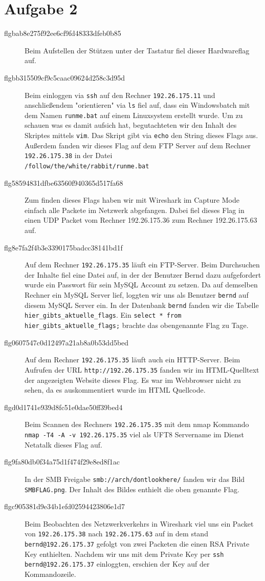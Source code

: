 \documentclass[10pt,a4paper]{article}
\begin{document}
\section{Aufgabe 2}
\begin{description}
	\item[flgbab8e275f92ee6cf9fd48333dfeb0b85] Beim Aufstellen der Stützen unter der Tastatur fiel dieser Hardwareflag auf. 
	\item[flgbb315509cf9c5caac09624d258c3d95d] Beim einloggen via \texttt{ssh} auf den Rechner \texttt{192.26.175.11} und anschließendem "orientieren" via \texttt{ls} fiel auf, dass ein Windowsbatch mit dem Namen \texttt{runme.bat} auf einem Linuxsystem erstellt wurde. Um zu schauen was es damit aufsich hat, begutachteten wir den Inhalt des Skriptes mittels \texttt{vim}. Das Skript gibt via \texttt{echo} den String dieses Flags aus.
	Außerdem fanden wir dieses Flag auf dem FTP Server auf dem Rechner \texttt{192.26.175.38} in der Datei \\ \texttt{/follow/the/white/rabbit/runme.bat}
	\item[flg58594831dfbe63560f940365d517fa68] Zum finden dieses Flags haben wir mit Wireshark im Capture Mode einfach alle Packete im Netzwerk abgefangen. Dabei fiel dieses Flag in einen UDP Packet vom Rechner 192.26.175.36 zum Rechner 192.26.175.63 auf.
	\item[flg8e7fa2f4b3e3390175badcc38141bd1f] Auf dem Rechner \texttt{192.26.175.35} läuft ein FTP-Server. Beim Durchsuchen der Inhalte fiel eine Datei auf, in der der Benutzer Bernd dazu aufgefordert wurde ein Passwort für sein MySQL Account zu setzen. Da auf demselben Rechner ein MySQL Server lief, loggten wir uns als Benutzer \texttt{bernd} auf diesem MySQL Server ein. In der Datenbank \texttt{bernd} fanden wir die Tabelle \texttt{hier\_gibts\_aktuelle\_flags}. Ein \texttt{select * from hier\_gibts\_aktuelle\_flags;} brachte das obengenannte Flag zu Tage.
	\item[flg0607547c0d12497a21ab8a0b53dd5bed] Auf dem Rechner \texttt{192.26.175.35} läuft auch ein HTTP-Server. Beim Aufrufen der URL \texttt{http://192.26.175.35} fanden wir im HTML-Quelltext der angezeigten Website dieses Flag. Es war im Webbrowser nicht zu sehen, da es auskommentiert wurde im HTML Quellcode.
	\item[flgd0d1741e939d8fc51e0dae50ff39bed4] Beim Scannen des Rechners \texttt{192.26.175.35} mit dem nmap Kommando \texttt{nmap -T4 -A -v 192.26.175.35} viel als UFT8 Servername im Dienst Netatalk dieses Flag auf.
	\item[flg9fa80db0f34a75d1f474f29e8ed8f1ac] In der SMB Freigabe \texttt{smb://arch/dontlookhere/} fanden wir das Bild \texttt{SMBFLAG.png}. Der Inhalt des Bildes enthielt die oben genannte Flag.
	\item[flgc905381d9e34b1efd02594423806e1d7] Beim Beobachten des Netzwerkverkehrs in Wireshark viel uns ein Packet von \texttt{192.26.175.38} nach \texttt{192.26.175.63} auf in dem stand \texttt{bernd@192.26.175.37} gefolgt von zwei Packeten die einen RSA Private Key enthielten. Nachdem wir uns mit dem Private Key per \texttt{ssh bernd@192.26.175.37} einloggten, erschien der Key auf der Kommandozeile.
\end{description}
\end{document}
